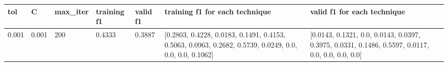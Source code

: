 \documentclass{article}%
\begin{document}
\begin{longtable}{l l l l l l l}%
\hline%
tol&C&max\_iter&training f1&valid f1&training f1 for each technique&valid f1 for each technique\\%
\hline%
\endhead%
\hline%
0.001&0.001&200&0.4333&0.3887&{[}0.2803, 0.4228, 0.0183, 0.1491, 0.4153, 0.5063, 0.0963, 0.2682, 0.5739, 0.0249, 0.0, 0.0, 0.0, 0.1062{]}&{[}0.0143, 0.1321, 0.0, 0.0143, 0.0397, 0.3975, 0.0331, 0.1486, 0.5597, 0.0117, 0.0, 0.0, 0.0, 0.0{]}\\%
\hline%
\end{longtable}%
\end{document}
